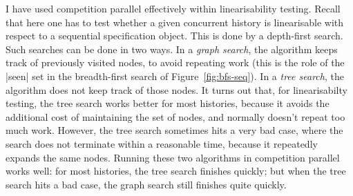 I have used competition parallel effectively within linearisability testing.
Recall that here one has to test whether a given concurrent history is
linearisable with respect to a sequential specification object.  This is done
by a depth-first search.  Such searches can be done in two ways.  In a
\emph{graph search}, the algorithm keeps track of previously visited nodes, to
avoid repeating work (this is the role of the |seen| set in the breadth-first
search of Figure~\ref{fig:bfs-seq}).  In a \emph{tree search}, the algorithm
does not keep track of those nodes.  It turns out that, for linearisabilty
testing, the tree search works better for most histories, because it avoids
the additional cost of maintaining the set of nodes, and normally doesn't
repeat too much work.  However, the tree search sometimes hits a very bad
case, where the search does not terminate within a reasonable time, because it
repeatedly expands the same nodes.  Running these two algorithms in
competition parallel works well: for most histories, the tree search finishes
quickly; but when the tree search hits a bad case, the graph search still
finishes quite quickly.

